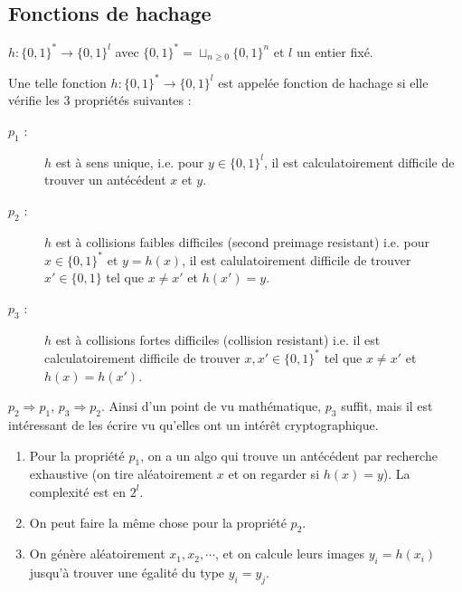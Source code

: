         \subsection{Fonctions de hachage}
            $h : \{0,1\}^* \to \{0,1\}^l$ avec $\{0,1\}^* = \sqcup_{n \geq 0} \{0,1\}^n$ et $l$ un entier fixé. 
            \begin{defi}
                Une telle fonction $h : \{0,1\}^* \to \{0,1\}^l$ est appelée fonction de hachage si elle vérifie les 3 propriétés suivantes : 
                \begin{description}
                    \item[$p_1$ :] $h$ est à sens unique, i.e. pour $y \in \{0,1\}^l$, il est calculatoirement difficile de trouver un antécédent $x$ et $y$. 
                    \item[$p_2$ :] $h$ est à collisions faibles difficiles (second preimage resistant) i.e. pour $x \in \{0,1\}^*$ et $y = h(x)$, il est calulatoirement difficile de trouver $x' \in \{0,1\}$ tel que $x \neq x'$ et $h(x') = y$.
                    \item[$p_3$ :] $h$ est à collisions fortes difficiles (collision resistant) i.e. il est calculatoirement difficile de trouver $x,x' \in \{0,1\}^*$ tel que $x \neq x'$ et $h(x) = h(x')$.   
                \end{description}
            \end{defi}
            \begin{remq}
                $p_2 \Rightarrow p_1$, $p_3 \Rightarrow p_2$. Ainsi d'un point de vu mathématique, $p_3$ suffit, mais il est intéressant de les écrire vu qu'elles ont un intérêt cryptographique.
            \end{remq}
            \begin{enumerate}
                \item Pour la propriété $p_1$, on a un algo qui trouve un antécédent par recherche exhaustive (on tire aléatoirement $x$ et on regarder si $h(x) = y$). La complexité est en $2^l$.
                \item On peut faire la même chose pour la propriété $p_2$. 
                \item On génère aléatoirement $x_1, x_2, \cdots$, et on calcule leurs images $y_i = h(x_i)$ jusqu'à trouver une égalité du type $y_i = y_j$.
            \end{enumerate}